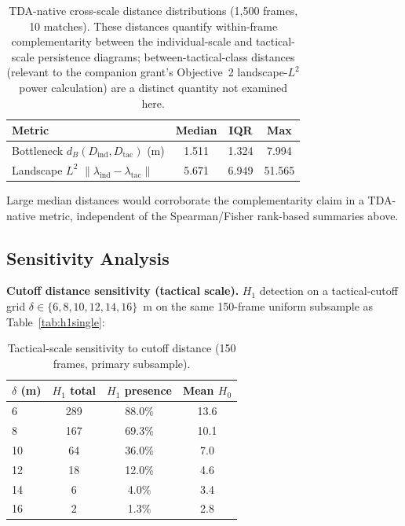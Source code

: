 \begin{table}[H]
  \centering
  \caption{TDA-native cross-scale distance distributions (1{,}500 frames, 10 matches). These distances quantify within-frame complementarity between the individual-scale and tactical-scale persistence diagrams; between-tactical-class distances (relevant to the companion grant's Objective~2 landscape-$L^2$ power calculation) are a distinct quantity not examined here.}
  \label{tab:tda_distances}
  \begin{tabular}{@{}lccc@{}}
      \toprule
      Metric & Median & IQR & Max \\
      \midrule
      Bottleneck \(d_B(D_\mathrm{ind}, D_\mathrm{tac})\) (m) & 1.511 & 1.324 & 7.994 \\
      Landscape \(L^2\) \(\|\lambda_\mathrm{ind}-\lambda_\mathrm{tac}\|\) & 5.671 & 6.949 & 51.565 \\
      \bottomrule
  \end{tabular}
\end{table}

Large median distances would corroborate the complementarity claim in a TDA-native metric, independent of the Spearman/Fisher rank-based summaries above.

\subsection{Sensitivity Analysis}
\label{sec:sensitivity}

\textbf{Cutoff distance sensitivity (tactical scale).} \(H_1\) detection on a tactical-cutoff grid \(\delta\in\{6,8,10,12,14,16\}\)~m on the same 150-frame uniform subsample as Table~\ref{tab:h1single}:

\begin{table}[H]
  \centering
  \caption{Tactical-scale sensitivity to cutoff distance (150 frames, primary subsample).}
  \label{tab:senscut}
  \begin{tabular}{@{}lccc@{}}
    \toprule
    \(\delta\) (m) & \(H_1\) total & \(H_1\) presence & Mean \(H_0\) \\
    \midrule
    6  & 289 & 88.0\% & 13.6 \\
    8  & 167 & 69.3\% & 10.1 \\
    10 & 64 & 36.0\% & 7.0 \\
    12 & 18 & 12.0\% & 4.6 \\
    14 & 6 & 4.0\% & 3.4 \\
    16 & 2 & 1.3\% & 2.8 \\
    \bottomrule
  \end{tabular}
\end{table}

